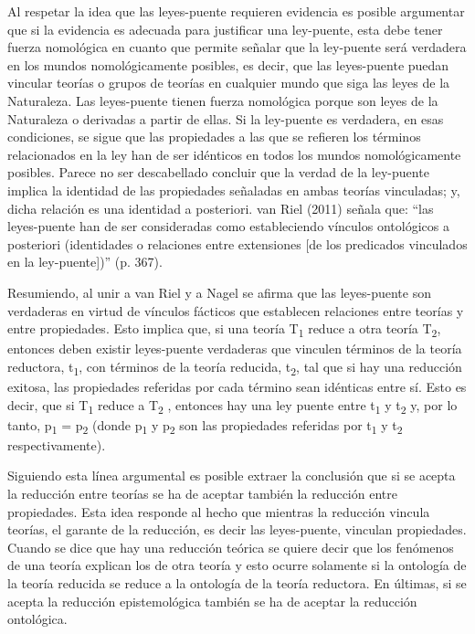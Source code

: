 \documentclass[]{book}
\begin{document}
Al respetar la idea que las leyes-puente requieren evidencia es posible
argumentar que si la evidencia es adecuada para justificar una
ley-puente, esta debe tener fuerza nomológica en cuanto que permite
señalar que la ley-puente será verdadera en los mundos nomológicamente
posibles, es decir, que las leyes-puente puedan vincular teorías o
grupos de teorías en cualquier mundo que siga las leyes de la
Naturaleza. Las leyes-puente tienen fuerza nomológica porque son leyes
de la Naturaleza o derivadas a partir de ellas. Si la ley-puente es
verdadera, en esas condiciones, se sigue que las propiedades a las que
se refieren los términos relacionados en la ley han de ser idénticos en
todos los mundos nomológicamente posibles. Parece no ser descabellado
concluir que la verdad de la ley-puente implica la identidad de las
propiedades señaladas en ambas teorías vinculadas; y, dicha relación es
una identidad a posteriori. van Riel (2011) señala que: ``las
leyes-puente han de ser consideradas como estableciendo vínculos
ontológicos a posteriori (identidades o relaciones entre extensiones
{[}de los predicados vinculados en la ley-puente{]})'' (p. 367).

Resumiendo, al unir a van Riel y a Nagel se afirma que las leyes-puente
son verdaderas en virtud de vínculos fácticos que establecen relaciones
entre teorías y entre propiedades. Esto implica que, si una teoría
T\textsubscript{1} reduce a otra teoría T\textsubscript{2}, entonces
deben existir leyes-puente verdaderas que vinculen términos de la teoría
reductora, t\textsubscript{1}, con términos de la teoría reducida,
t\textsubscript{2}, tal que si hay una reducción exitosa, las
propiedades referidas por cada término sean idénticas entre sí. Esto es
decir, que si T\textsubscript{1} reduce a T\textsubscript{2} , entonces
hay una ley puente entre t\textsubscript{1} y t\textsubscript{2} y, por
lo tanto, p\textsubscript{1} = p\textsubscript{2} (donde
p\textsubscript{1} y p\textsubscript{2} son las propiedades referidas
por t\textsubscript{1} y t\textsubscript{2} respectivamente).

Siguiendo esta línea argumental es posible extraer la conclusión que si
se acepta la reducción entre teorías se ha de aceptar también la
reducción entre propiedades. Esta idea responde al hecho que mientras la
reducción vincula teorías, el garante de la reducción, es decir las
leyes-puente, vinculan propiedades. Cuando se dice que hay una reducción
teórica se quiere decir que los fenómenos de una teoría explican los de
otra teoría y esto ocurre solamente si la ontología de la teoría
reducida se reduce a la ontología de la teoría reductora. En últimas, si
se acepta la reducción epistemológica también se ha de aceptar la
reducción ontológica.
\end{document}
